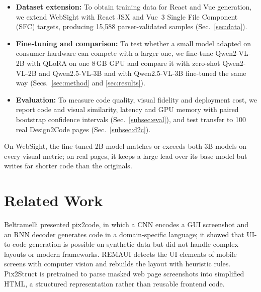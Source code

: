 \documentclass[conference,a4paper]{IEEEtran}
\begin{document}
\begin{itemize}
    \item \textbf{Dataset extension:} To obtain training data for React and Vue generation, we extend WebSight with React JSX and Vue~3 Single File Component (SFC) targets, producing 15,588 parser-validated samples (Sec.~\ref{sec:data}).

    \item \textbf{Fine-tuning and comparison:} To test whether a small model adapted on consumer hardware can compete with a larger one, we fine-tune Qwen2-VL-2B with QLoRA on one 8\,GB GPU and compare it with zero-shot Qwen2-VL-2B and Qwen2.5-VL-3B and with Qwen2.5-VL-3B fine-tuned the same way (Secs.~\ref{sec:method} and \ref{sec:results}).

    \item \textbf{Evaluation:} To measure code quality, visual fidelity and deployment cost, we report code and visual similarity, latency and GPU memory with paired bootstrap confidence intervals (Sec.~\ref{subsec:eval}), and test transfer to 100 real Design2Code pages (Sec.~\ref{subsec:d2c}).
\end{itemize}

On WebSight, the fine-tuned 2B model matches or exceeds both 3B models on every
visual metric; on real pages, it keeps a large lead over its base model but
writes far shorter code than the originals.









\newcommand{\cmark}{$\checkmark$} %
\newcommand{\xmark}{$\times$}     %

\section{Related Work}






Beltramelli \cite{beltramelli2017pix2code} presented pix2code, in which a CNN encodes a GUI screenshot and an RNN decoder generates code in a domain-specific language; it showed that UI-to-code generation is possible on synthetic data but did not handle complex layouts or modern frameworks. REMAUI \cite{nguyen2015reverse} detects the UI elements of mobile screens with computer vision and rebuilds the layout with heuristic rules. Pix2Struct \cite{lee2023pix2struct} is pretrained to parse masked web page screenshots into simplified HTML, a structured representation rather than reusable frontend code.
\end{document}
